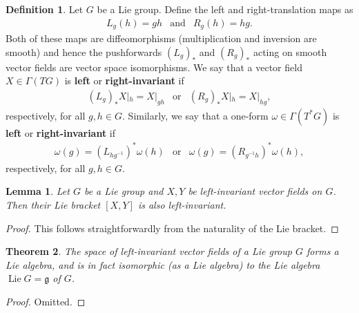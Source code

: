 \documentclass{book}
\newcommand{\fr}{\mathfrak}
\DeclareMathOperator{\Lie}{Lie}
\theoremstyle{plain}
\newtheorem{thm}{Theorem}
\newtheorem{lem}[thm]{Lemma}
\theoremstyle{definition}
\newtheorem{defn}{Definition}
\theoremstyle{remark}
\begin{document}
\begin{defn}
    Let $G$ be a Lie group. Define the left and right-translation maps as
    \[
        \begin{array}{ccc}
            L_g(h)=gh & \text{and} & R_g(h)=hg.
        \end{array}
    \]
    Both of these maps are diffeomorphisms (multiplication and inversion are smooth) and hence the pushforwards $(L_g)_*$ and $(R_g)_*$
    acting on smooth vector fields are vector space isomorphisms. We say that a vector field $X\in\Gamma(TG)$ is \textbf{left} or \textbf{right-invariant} if
    \[
        \begin{array}{ccc}
            (L_g)_*X|_h=X|_{gh} & \text{or} & (R_g)_*X|_h=X|_{hg},
        \end{array}
    \]
    respectively, for all $g,h\in G$.
    Similarly, we say that a one-form $\omega\in\Gamma(T^*G)$ is \textbf{left} or \textbf{right-invariant} if
    \[
        \begin{array}{ccc}
            \omega(g)=\left( L_{hg^{-1}} \right)^*\omega(h) & \text{or} & \omega(g)=\left( R_{g^{-1}h} \right)^*\omega(h),
        \end{array}
    \]
    respectively, for all $g,h\in G$.
\end{defn}

\begin{lem}
    Let $G$ be a Lie group and $X,Y$ be left-invariant vector fields on $G$. Then their Lie bracket $[X,Y]$ is also left-invariant.
\end{lem}
\begin{proof}
    This follows straightforwardly from the naturality of the Lie bracket.
\end{proof}

\begin{thm}
    The space of left-invariant vector fields of a Lie group $G$ forms a Lie algebra, and is in fact isomorphic (as a Lie algebra) to the Lie algebra
    $\Lie G=\fr g$ of $G$.
\end{thm}
\begin{proof}
    Omitted.
\end{proof}
\end{document}
